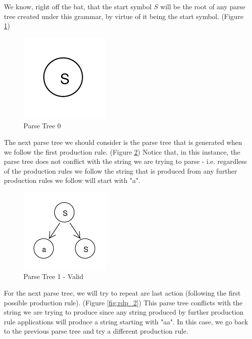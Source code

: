 \documentclass[11pt]{article}
\begin{document}
We know, right off the bat, that the start symbol $S$ will be the root of any parse tree created under this
grammar, by virtue of it being the start symbol. (Figure \ref{fig:rdp_0})

\begin{figure}[h!]
    \centering
    \includegraphics[natwidth=15,natheight=15]{rdp_0.pdf}
    \caption{Parse Tree 0}
    \label{fig:rdp_0}
\end{figure}

The next parse tree we should consider is the parse tree that is generated when we follow the first 
production rule. (Figure \ref{fig:rdp_1}) Notice that, in this instance, the parse tree does not conflict with
the string we are trying to parse - i.e. regardless of the production rules we follow the string that is
produced from any further production rules we follow will start with "a".

\begin{figure}[h!]
    \centering
    \includegraphics[width=0.4\textwidth,natwidth=30,natheight=30]{rdp_1.pdf}
    \caption{Parse Tree 1 - Valid}
    \label{fig:rdp_1}
\end{figure}

For the next parse tree, we will try to repeat are last action (following the first possible production rule).
(Figure \ref{fig:rdp_2}) This parse tree conflicts with the string we are trying to produce since any
string produced by further production rule applications will produce a string starting with "aa".
In this case, we go back to the previous parse tree and try a different production rule.
\end{document}

